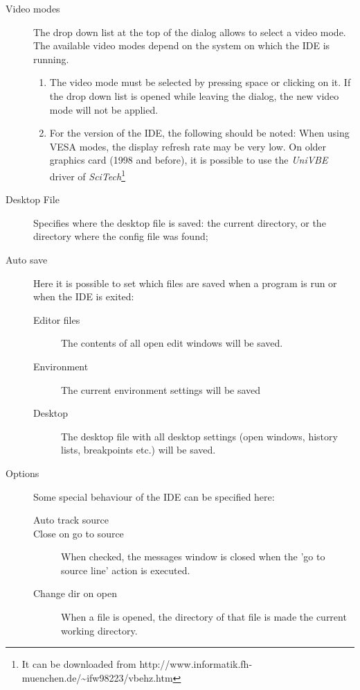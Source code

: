 \begin{description}
\item[Video modes]
The drop down list at the top of the dialog allows to select a video mode.
The available video modes depend on the system on which the IDE
is running. 
\begin{remark}
\begin{enumerate}
\item The video mode must be selected by pressing space or clicking
on it. If the drop down list is opened while leaving the dialog,
the new video mode will not be applied.
\item For the \dos version of the IDE, the following should be noted:
When using VESA modes, the display refresh rate may be very low. 
On older graphics card (1998 and before), it is possible to use the
{\em UniVBE} driver of {\em SciTech}\footnote{It can be downloaded from
{http://www.informatik.fh-muenchen.de/\~{}ifw98223/vbehz.htm}}
\end{enumerate}
\end{remark}
\item[Desktop File]
Specifies where the desktop file is saved: the current directory, or the
directory where the config file was found;
\item[Auto save]
Here it is possible to set which files are saved when a program is run or
when the IDE is exited:
\begin{description}
\item[Editor files] The contents of all open edit windows will be saved.
\item[Environment] The current environment settings will be saved
\item[Desktop] The desktop file with all desktop settings (open windows,
history lists, breakpoints etc.) will be saved.
\end{description}
\item[Options] 
Some special behaviour of the IDE can be specified here:
\begin{description}
\item[Auto track source]
\item[Close on go to source] When checked, the messages window is closed 
when the 'go to source line' action is executed.
\item[Change dir on open] When a file is opened, the directory of that file
is made the current working directory.
\end{description}
\end{description}
%
%
